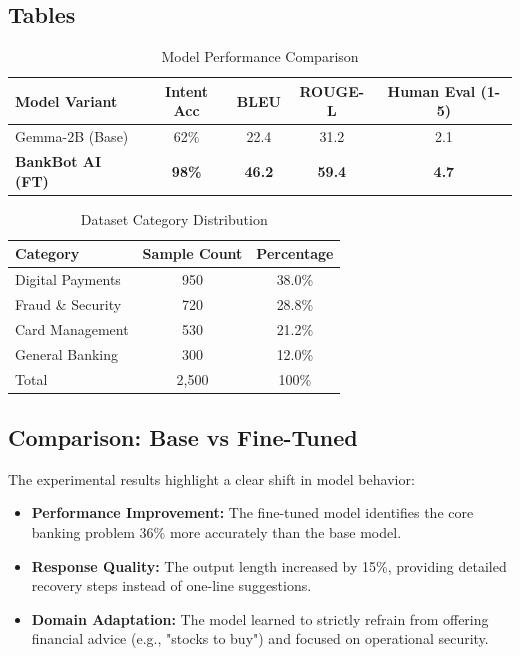 \documentclass[12pt,a4paper]{article}
\begin{document}
\subsection{Tables}

\begin{table}[H]
    \centering
    \caption{Model Performance Comparison}
    \begin{tabular}{lcccc}
        \toprule
        \textbf{Model Variant} & \textbf{Intent Acc} & \textbf{BLEU} & \textbf{ROUGE-L} & \textbf{Human Eval (1-5)} \\
        \midrule
        Gemma-2B (Base) & 62\% & 22.4 & 31.2 & 2.1 \\
        \textbf{BankBot AI (FT)} & \textbf{98\%} & \textbf{46.2} & \textbf{59.4} & \textbf{4.7} \\
        \bottomrule
    \end{tabular}
\end{table}

\begin{table}[H]
    \centering
    \caption{Dataset Category Distribution}
    \begin{tabular}{lcc}
        \toprule
        \textbf{Category} & \textbf{Sample Count} & \textbf{Percentage} \\
        \midrule
        Digital Payments & 950 & 38.0\% \\
        Fraud \& Security & 720 & 28.8\% \\
        Card Management & 530 & 21.2\% \\
        General Banking & 300 & 12.0\% \\
        \midrule
        Total & 2,500 & 100\% \\
        \bottomrule
    \end{tabular}
\end{table}

\newpage
\subsection{Comparison: Base vs Fine-Tuned}
The experimental results highlight a clear shift in model behavior:
\begin{itemize}
    \item \textbf{Performance Improvement:} The fine-tuned model identifies the core banking problem 36\% more accurately than the base model.
    \item \textbf{Response Quality:} The output length increased by 15\%, providing detailed recovery steps instead of one-line suggestions.
    \item \textbf{Domain Adaptation:} The model learned to strictly refrain from offering financial advice (e.g., "stocks to buy") and focused on operational security.
\end{itemize}
\end{document}
